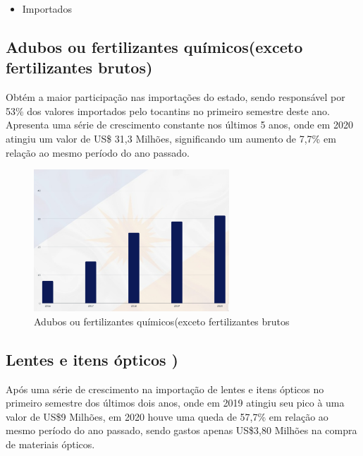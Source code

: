 \begin{itemize}
	\item Importados
\end{itemize}

\subsection {Adubos ou fertilizantes químicos(exceto fertilizantes brutos)}
\par Obtém a maior participação nas importações do estado, sendo responsável por 53\% dos valores importados pelo tocantins no primeiro semestre deste ano. Apresenta uma série de crescimento constante nos últimos 5 anos, onde em 2020 atingiu um valor de US\$ 31,3 Milhões, significando um aumento de 7,7\% em relação ao mesmo período do ano passado.

\begin{figure} [h] \caption{Adubos ou fertilizantes químicos(exceto fertilizantes brutos}
	\includegraphics[width=\linewidth]{fig/adubos1.png}
\end{figure}

\newpage 

\subsection {Lentes e itens ópticos )}
\par Após uma série de crescimento na importação de lentes e itens ópticos no primeiro semestre dos últimos dois anos, onde em 2019 atingiu seu pico à uma valor de US\$9 Milhões, em 2020 houve uma queda de 57,7\% em relação ao mesmo período do ano passado, sendo gastos apenas US\$3,80 Milhões na compra de materiais ópticos. 

